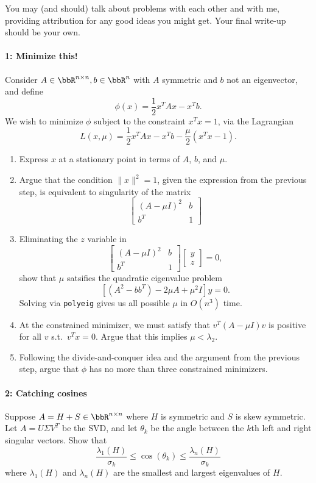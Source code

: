 \documentclass[12pt, leqno]{article} %
\begin{document}

You may (and should) talk about problems with each other and with me,
providing attribution for any good ideas you might get.  Your final
write-up should be your own.

\paragraph*{1: Minimize this!}
Consider $A \in \bbR^{n \times n}, b \in \bbR^n$ with $A$ symmetric
and $b$ not an eigenvector, and define
\[
  \phi(x) = \frac{1}{2} x^T A x - x^T b.
\]
We wish to minimize $\phi$ subject to the constraint $x^T x = 1$,
via the Lagrangian
\[
  L(x,\mu) = \frac{1}{2} x^T A x - x^T b - \frac{\mu}{2} (x^T x - 1).
\]
\begin{enumerate}
\item Express $x$ at a stationary point in terms
  of $A$, $b$, and $\mu$.
\item Argue that the condition $\|x\|^2 = 1$, given the expression
  from the previous step, is equivalent to
  singularity of the matrix
  \[
    \begin{bmatrix} (A-\mu I)^2 & b \\ b^T & 1 \end{bmatrix}
  \]
\item
  Eliminating the $z$ variable in
  \[
    \begin{bmatrix}
      (A-\mu I)^2 & b \\
      b^T & 1
    \end{bmatrix}
    \begin{bmatrix} y \\ z \end{bmatrix} = 0,
  \]
  show that $\mu$ satsifies the quadratic eigenvalue problem
  \[
    \left[ (A^2-bb^T) - 2 \mu A + \mu^2 I \right] y = 0.
  \]
  Solving via {\tt polyeig} gives
  us all possible $\mu$ in $O(n^3)$ time.
\item
  At the constrained minimizer, we must satisfy that
  $v^T (A-\mu I) v$ is positive for all $v$ s.t.~$v^T x = 0$.
  Argue that this implies $\mu < \lambda_2$.
\item
  Following the divide-and-conquer idea and the argument
  from the previous step, argue that $\phi$
  has no more than three constrained minimizers.
\end{enumerate}

\paragraph*{2: Catching cosines}
Suppose $A = H+S \in \bbR^{n \times n}$ where $H$ is symmetric
and $S$ is skew symmetric.  Let $A = U \Sigma V^T$ be the SVD,
and let $\theta_k$ be the angle between the $k$th left and right
singular vectors.  Show that
\[
  \frac{\lambda_1(H)}{\sigma_k} \leq \cos(\theta_k) \leq \frac{\lambda_n(H)}{\sigma_k}
\]
where $\lambda_1(H)$ and $\lambda_n(H)$ are the smallest and largest
eigenvalues of $H$.
\end{document}
